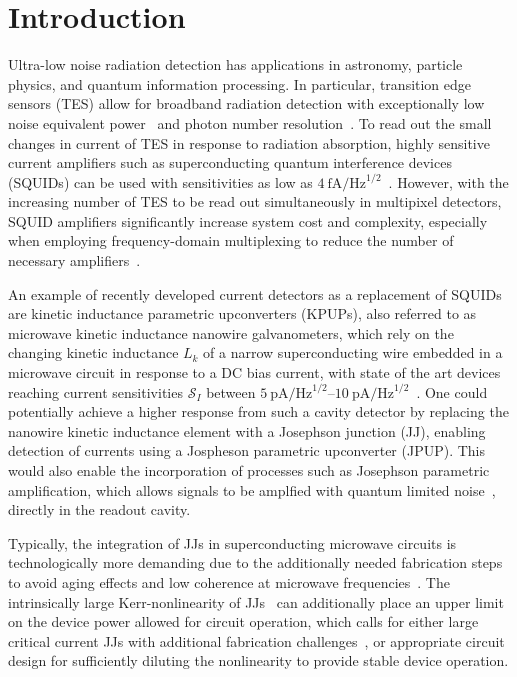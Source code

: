 \section{Introduction}

Ultra-low noise radiation detection has applications in astronomy, particle physics, and quantum information processing.
% 
In particular, transition edge sensors (TES) allow for broadband radiation detection with exceptionally low noise equivalent power~\cite{goldieUltralownoiseMoCuTransition2011} and photon number resolution~\cite{cabreraDetectionSingleInfrared1998,millerDemonstrationLownoiseNearinfrared2003}.
% 
To read out the small changes in current of TES in response to radiation absorption, highly sensitive current amplifiers such as superconducting quantum interference devices (SQUIDs) can be used with sensitivities as low as $\SI{4}{\femto\ampere\per\hertz\tothe{1/2}}$~\cite{gayUltralowNoiseCurrent2000}.
% 
However, with the increasing number of TES to be read out simultaneously in multipixel detectors, SQUID amplifiers significantly increase system cost and complexity, especially when employing frequency-domain multiplexing to reduce the number of necessary amplifiers~\cite{hendersonReadoutTwokilopixelTransitionedge2016}.

An example of recently developed current detectors as a replacement of SQUIDs are kinetic inductance parametric upconverters (KPUPs), also referred to as microwave kinetic inductance nanowire galvanometers, which rely on the changing kinetic inductance $L_k$ of a narrow superconducting wire embedded in a microwave circuit in response to a DC bias current, with state of the art devices reaching current sensitivities $\mathcal{S}_I$ between $\SIrange{5}{10}{\pico\ampere\per\hertz\tothe{1/2}}$~\cite{kherKineticInductanceParametric2016,doernerCompactMicrowaveKinetic2018,kuzminTerahertzTransitionEdgeSensor2018}.
%
One could potentially achieve a higher response from such a cavity detector by replacing the nanowire kinetic inductance element with a Josephson junction (JJ), enabling detection of currents using a Jospheson parametric upconverter (JPUP). 
% 
This would also enable the incorporation of processes such as Josephson parametric amplification, which allows signals to be amplfied with quantum limited noise~\cite{stehlikFastChargeSensing2015}, directly in the readout cavity.

Typically, the integration of JJs in superconducting microwave circuits is technologically more demanding due to the additionally needed fabrication steps to avoid aging effects and low coherence at microwave frequencies~\cite{pavolotskyAgingAnnealinginducedVariations2011,gotetiReliabilityStudiesNb2019,gunnarssonDielectricLossesMultilayer2013,yanaiObservationEnhancedCoherence2019}.
% 
The intrinsically large Kerr-nonlinearity of JJs~\cite{wallraffStrongCouplingSingle2004} can additionally place an upper limit on the device power allowed for circuit operation, which calls for either large critical current JJs with additional fabrication challenges~\cite{lecocqJunctionFabricationShadow2011}, or appropriate circuit design for sufficiently diluting the nonlinearity to provide stable device operation.

